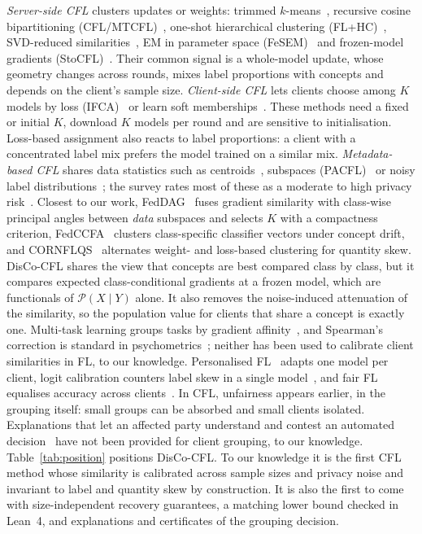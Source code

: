 \documentclass[journal]{IEEEtran}
\theoremstyle{definition}
\newcommand{\cP}{\mathcal{P}}
\begin{document}
\emph{Server-side CFL} clusters updates or weights: trimmed $k$-means~\cite{ghosh2019robust}, recursive cosine bipartitioning (CFL/MTCFL)~\cite{sattler2021cfl}, one-shot hierarchical clustering (FL+HC)~\cite{briggs2020flhc}, SVD-reduced similarities~\cite{duan2021flexcfl,yan2023icfl}, EM in parameter space (FeSEM)~\cite{long2023fesem} and frozen-model gradients (StoCFL)~\cite{zeng2025stocfl}. Their common signal is a whole-model update, whose geometry changes across rounds, mixes label proportions with concepts and depends on the client's sample size. \emph{Client-side CFL} lets clients choose among $K$ models by loss (IFCA)~\cite{ghosh2020ifca,mansour2020three} or learn soft memberships~\cite{li2021flsc,ruan2022fedsoft,marfoq2021fedem,guo2024fedrc,guo2025hcfl}. These methods need a fixed or initial $K$, download $K$ models per round and are sensitive to initialisation. Loss-based assignment also reacts to label proportions: a client with a concentrated label mix prefers the model trained on a similar mix. \emph{Metadata-based CFL} shares data statistics such as centroids~\cite{dennis2021kfed}, subspaces (PACFL)~\cite{vahidian2023pacfl} or noisy label distributions~\cite{luo2024ppcfl}; the survey rates most of these as a moderate to high privacy risk~\cite{benali2026survey}. Closest to our work, FedDAG~\cite{pramanik2026feddag} fuses gradient similarity with class-wise principal angles between \emph{data} subspaces and selects $K$ with a compactness criterion, FedCCFA~\cite{chen2024fedccfa} clusters class-specific classifier vectors under concept drift, and CORNFLQS~\cite{benali2025cornflqs} alternates weight- and loss-based clustering for quantity skew. DisCo-CFL shares the view that concepts are best compared class by class, but it compares expected class-conditional gradients at a frozen model, which are functionals of $\cP(X\mid Y)$ alone. It also removes the noise-induced attenuation of the similarity, so the population value for clients that share a concept is exactly one. Multi-task learning groups tasks by gradient affinity~\cite{fifty2021tag,yu2020pcgrad}, and Spearman's correction is standard in psychometrics~\cite{spearman1910,muchinsky1996attenuation}; neither has been used to calibrate client similarities in FL, to our knowledge. Personalised FL~\cite{tan2022pflsurvey,li2021ditto,collins2021fedrep,fallah2020perfedavg} adapts one model per client, logit calibration counters label skew in a single model~\cite{zhang2022fedlc,menon2021logit}, and fair FL equalises accuracy across clients~\cite{li2020qffl,mohri2019afl}. In CFL, unfairness appears earlier, in the grouping itself: small groups can be absorbed and small clients isolated. Explanations that let an affected party understand and contest an automated decision~\cite{wachter2018counterfactual,doshivelez2017interpretable} have not been provided for client grouping, to our knowledge. Table~\ref{tab:position} positions DisCo-CFL. To our knowledge it is the first CFL method whose similarity is calibrated across sample sizes and privacy noise and invariant to label and quantity skew by construction. It is also the first to come with size-independent recovery guarantees, a matching lower bound checked in Lean~4, and explanations and certificates of the grouping decision.
\end{document}
